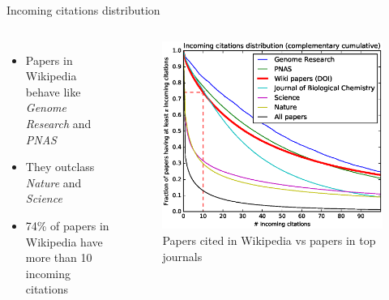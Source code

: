 \documentclass{beamer}
\begin{document}
\begin{frame}{Incoming citations distribution}
    \begin{columns}
        \begin{itemize}
            \item Papers in Wikipedia behave like \emph{Genome Research} and \emph{PNAS}
            \item They outclass \emph{Nature} and \emph{Science}
            \item 74\% of papers in Wikipedia have more than 10 incoming citations
        \end{itemize}
        \begin{figure}
        \centering
        \includegraphics[width=1\textwidth]{assets/incoming_citations_distribution_ccdf_slides}
        \caption{Papers cited in Wikipedia vs papers in top journals}
        \end{figure}
    \end{columns}
\end{frame}
\end{document}
